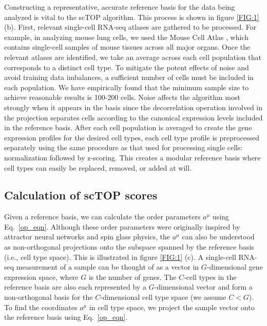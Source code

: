 \documentclass[aps,superscriptaddress, notitlepage,longbibliography]{revtex4-1}
\begin{document}
Constructing a representative, accurate reference basis for the data being analyzed is vital to the scTOP algorithm. This process is shown in figure \ref{FIG:1} (b). First, relevant single-cell RNA-seq atlases are gathered to be processed. For example, in analyzing mouse lung cells, we used the Mouse Cell Atlas \cite{noauthor_mapping_nodate}, which contains single-cell samples of mouse tissues across all major organs. Once the relevant atlases are identified, we take an average across each cell population that corresponds to a distinct cell type. To mitigate the potent effects of noise and avoid training data imbalances, a sufficient number of cells must be included in each population. We have empirically found that the minimum sample size to achieve reasonable results is 100-200 cells. Noise affects the algorithm most strongly when it appears in the basis since the decorrelation operation involved in the projection separates cells according to the canonical expression levels included in the reference basis. After each cell population is averaged to create the gene expression profiles for the desired cell types, each cell type profile is preprocessed separately using the same procedure as that used for processing single cells: normalization followed by z-scoring. This creates a modular reference basis where cell types can easily be replaced, removed, or added at will. 



\subsection{Calculation of scTOP scores}

Given a reference basis, we can calculate the order parameters $a^\mu$ using Eq.~\ref{op_eqn}. Although these order parameters were originally inspired by attractor neural networks and spin glass physics, the $a^{\mu}$ can also be understood as non-orthogonal projections onto the subspace spanned by the reference basis (i.e., cell type space). This is illustrated in figure \ref{FIG:1} (c). A single-cell RNA-seq measurement of a sample can be thought of as a vector in $G$-dimensional gene expression space, where $G$ is the number of genes. The $C$-cell types in the reference basis are also each represented by a $G$-dimensional vector and form a non-orthogonal basis for the $C$-dimensional cell type space (we assume $C < G$). To find the coordinates $a^\mu$ in cell type space, we project the sample vector onto the reference basis using Eq.~\ref{op_eqn}.
\end{document}
